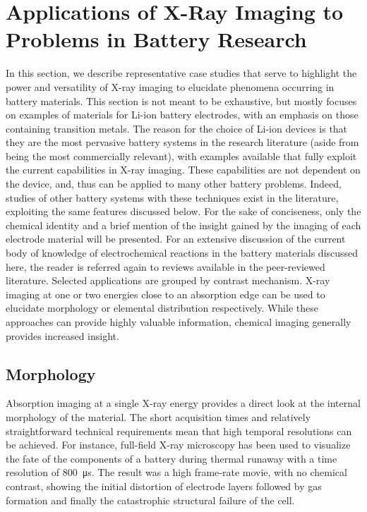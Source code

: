 \documentclass[journal=cmatex,manuscript=perspective]{achemso}
\begin{document}
\section{Applications of X-Ray Imaging to Problems in Battery Research}

In this section, we describe representative case studies that serve to
highlight the power and versatility of X-ray imaging to elucidate
phenomena occurring in battery materials. This section is not meant to
be exhaustive, but mostly focuses on examples of materials for Li-ion
battery electrodes, with an emphasis on those containing transition
metals. The reason for the choice of Li-ion devices is that they are
the most pervasive battery systems in the research literature (aside
from being the most commercially relevant), with examples available
that fully exploit the current capabilities in X-ray imaging. These
capabilities are not dependent on the device, and, thus can be applied
to many other battery problems. Indeed, studies of other battery
systems with these techniques exist in the literature, exploiting the
same features discussed below. For the sake of conciseness, only the
chemical identity and a brief mention of the insight gained by the
imaging of each electrode material will be presented. For an extensive
discussion of the current body of knowledge of electrochemical
reactions in the battery materials discussed here, the reader is
referred again to reviews available in the peer-reviewed
literature\cite{whittingham2014, balogun2016}. Selected applications
are grouped by contrast mechanism. X-ray imaging at one or two
energies close to an absorption edge can be used to elucidate
morphology or elemental distribution respectively. While these
approaches can provide highly valuable information, chemical imaging
generally provides increased insight.

\subsection{Morphology}

Absorption imaging at a single X-ray energy provides a direct look at
the internal morphology of the material. The short acquisition times
and relatively straightforward technical requirements mean that high
temporal resolutions can be achieved. For instance, full-field X-ray
microscopy has been used to visualize the fate of the components of a
battery during thermal runaway with a time resolution of
\SI{800}{\micro\second}\cite{shearing2015}. The result was a high
frame-rate movie, with no chemical contrast, showing the initial
distortion of electrode layers followed by gas formation and finally
the catastrophic structural failure of the cell.
\end{document}
